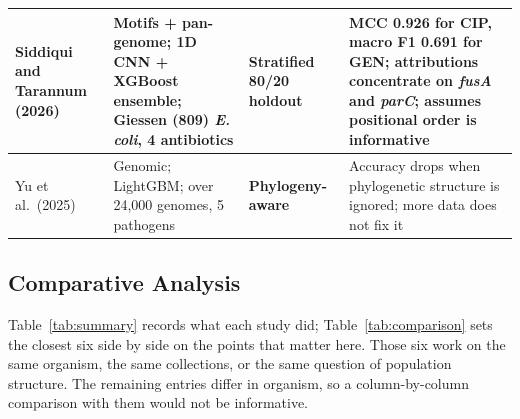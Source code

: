 {\begin{longtable}{|>{\raggedright\arraybackslash}p{2.7cm}|>{\raggedright\arraybackslash}p{3.9cm}|>{\raggedright\arraybackslash}p{2.2cm}|>{\raggedright\arraybackslash}p{4.7cm}|}
Siddiqui and Tarannum (2026) \cite{siddiqui2025amrensemble} & Motifs + pan-genome; 1D CNN + XGBoost ensemble; Giessen (809) \textit{E. coli}, 4 antibiotics & Stratified 80/20 holdout & MCC 0.926 for CIP, macro F1 0.691 for GEN; attributions concentrate on \textit{fusA} and \textit{parC}; assumes positional order is informative \\ \hline
Yu et al.\ (2025) \cite{Yu2025} & Genomic; LightGBM; over 24,000 genomes, 5 pathogens & \textbf{Phylogeny-\allowbreak aware} & Accuracy drops when phylogenetic structure is ignored; more data does not fix it \\ \hline
\end{longtable}}

\subsection{Comparative Analysis}

Table~\ref{tab:summary} records what each study did; Table~\ref{tab:comparison} sets
the closest six side by side on the points that matter here. Those six work on the
same organism, the same collections, or the same question of population structure.
The remaining entries differ in organism, so a column-by-column comparison with them
would not be informative.

